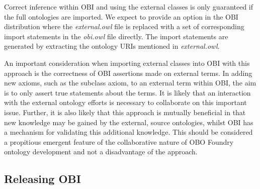 \documentclass{elsart}       %
\begin{document}
Correct inference within OBI and using the external classes is only guaranteed if the full ontologies are imported.
We expect to provide an option in the OBI distribution where the \emph{external.owl} file is replaced with a set of corresponding import statements in the \textit{obi.owl} file directly. 
The import statements are generated by extracting the ontology URIs mentioned in \emph{external.owl}. 

An important consideration when importing external classes into OBI with this approach is the correctness of OBI assertions made on external terms.
In adding new axioms, such as the subclass axiom, to an external term within OBI, the aim is to only assert true statements about the terms.
It is likely that an interaction with the external ontology efforts is necessary to collaborate on this important issue. Further, it is also likely that this approach is mutually beneficial in that new knowledge may be gained by the external, source ontologies, whilst OBI has a mechanism for validating this additional knowledge. This should be considered a propitious emergent feature of the collaborative nature of OBO Foundry ontology development and not a disadvantage of the approach.

\subsection{Releasing OBI}
\end{document}
